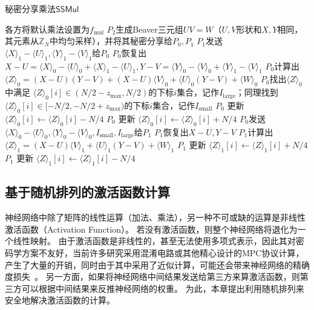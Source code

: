 \begin{algorithm}[h!]
\caption{秘密分享乘法$\mathsf{SSMul}$}
\label{alg:ss-perm:ss-mul}
    \begin{algorithmic}[1]
    \State 各方将默认乘法设置为$f_\text{mul}$ 
    \State $P_2$生成Beaver三元组$UV=W$（$U, V$形状和$X, Y$相同，其元素从$\mathbb Z_N$中均匀采样），并将其秘密分享给$P_0, P_1$
    \State $P_1$发送$\langle X \rangle_1 - \langle U \rangle_1, \langle Y \rangle_1 - \langle V \rangle_1$给$P_0$
    \State $P_0$恢复出
    $X - U = \langle X \rangle_0 - \langle U \rangle_0 + \langle X \rangle_1 - \langle U \rangle_1, 
     Y - V = \langle Y \rangle_0 - \langle V \rangle_0 + \langle Y \rangle_1 - \langle V \rangle_1$
     \State $P_0$计算出$\langle Z \rangle_0 = (X - U)(Y - V) + (X - U)\langle V \rangle_0 + \langle U \rangle_0 (Y - V) + \langle W \rangle_0$
    \State $P_0$找出$\langle Z \rangle_0$中满足 $\langle Z \rangle_0[i] \in (N/2 - z_\text{max}, N/2)$的下标$i$集合，记作$I_\text{large}$；同理找到$\langle Z \rangle_0[i] \in [-N/2, -N/2 + z_\text{max})$的下标$i$集合，记作$I_\text{small}$
        \State $P_0$ 更新 $\langle Z \rangle_0[i] \gets \langle Z \rangle_0[i] - N/4$
    \EndFor
        \State $P_0$ 更新 $\langle Z \rangle_0[i] \gets \langle Z \rangle_0[i] + N/4$
    \EndFor
    \State $P_0$发送$\langle X \rangle_0 - \langle U \rangle_0, \langle Y \rangle_0 - \langle V \rangle_0, I_\text{small}, I_\text{large}$给$P_1$
    \State $P_1$恢复出$X - U, Y - V$
    \State $P_1$计算出$\langle Z \rangle_1 = (X - U)\langle V \rangle_1 + \langle U \rangle_1(Y - V) + \langle W \rangle_1$
        \State $P_1$ 更新 $\langle Z \rangle_1[i] \gets \langle Z \rangle_1[i] + N/4$
    \EndFor
        \State $P_1$ 更新 $\langle Z \rangle_1[i] \gets \langle Z \rangle_1[i] - N/4$
    \EndFor
    \end{algorithmic}
\end{algorithm}




\subsection{基于随机排列的激活函数计算}
神经网络中除了矩阵的线性运算（加法、乘法），另一种不可或缺的运算是非线性激活函数（Activation Function）。
%
若没有激活函数，则整个神经网络将退化为一个线性映射。
%
由于激活函数是非线性的，甚至无法使用多项式表示，因此其对密码学方案不友好，当前许多研究采用混淆电路或其他精心设计的MPC协议计算，产生了大量的开销，同时由于其中采用了近似计算，可能还会带来神经网络的精确度损失~\cite{mohassel2017secureml,liujian2017minionn,mishra2020delphi}。
%
另一方面，如果将神经网络中间结果发送给第三方来算激活函数，则第三方可以根据中间结果来反推神经网络的权重。
%
为此，本章提出利用随机排列来安全地解决激活函数的计算。


